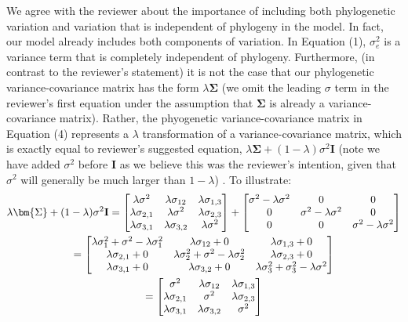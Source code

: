 \documentclass[11pt]{article}
\begin{document}
We agree with the reviewer about the importance of including both phylogenetic variation and variation that is independent of phylogeny in the model. In fact, our model already includes both components of variation. In Equation (1), $\sigma_e^2$ is a variance term that is completely independent of phylogeny. Furthermore, (in contrast to the reviewer's statement) it is not  the case that our phylogenetic variance-covariance matrix has the form $\lambda \bm{\Sigma}$ (we omit the leading $\sigma$ term in the reviewer's first equation under the assumption that $\bm{\Sigma}$ is already a variance-covariance matrix). Rather, the phyogenetic variance-covariance matrix in Equation (4) represents a $\lambda$ transformation of a variance-covariance matrix, which is exactly equal to reviewer's suggested equation, $\lambda \bm{\Sigma} + (1 - \lambda)\sigma^2\bm{I}$ (note we have added $\sigma^2$ before $\bm{I}$ as we believe this was the reviewer's intention, given that $\sigma^2$ will generally be much larger than $1-\lambda$) . To illustrate:\\

\begin{multline} \lambda \bm{\Sigma} + (1 - \lambda) \sigma^2{\bf I} =
  \begin{bmatrix}
    \lambda\sigma^2 & \lambda\sigma_{12} & \lambda\sigma_{1,3} \\
    \lambda\sigma_{2,1} & \lambda\sigma^2 & \lambda\sigma_{2,3} \\
    \lambda\sigma_{3,1} & \lambda\sigma_{3,2} & \lambda\sigma^2 \\
  \end{bmatrix}
  +
  \begin{bmatrix}
    \sigma^2 - \lambda\sigma^2 & 0 & 0 \\
    0 & \sigma^2 - \lambda\sigma^2 & 0 \\
    0 & 0 & \sigma^2-\lambda\sigma^2 \\
  \end{bmatrix}
  \\=
  \begin{bmatrix}
    \lambda\sigma_1^2 + \sigma^2 - \lambda\sigma_1^2 & \lambda\sigma_{12} +0 & \lambda\sigma_{1,3} +0\\
    \lambda\sigma_{2,1} +0 & \lambda\sigma_2^2 + \sigma^2 - \lambda\sigma_2^2 & \lambda\sigma_{2,3} +0\\
    \lambda\sigma_{3,1} +0 & \lambda\sigma_{3,2} +0 & \lambda\sigma_3^2 + \sigma_3^2 - \lambda\sigma^2 \\
  \end{bmatrix}
  \\=
  \begin{bmatrix}
    \sigma^2 & \lambda\sigma_{12} & \lambda\sigma_{1,3}\\
    \lambda\sigma_{2,1} & \sigma^2 & \lambda\sigma_{2,3}\\
    \lambda\sigma_{3,1}& \lambda\sigma_{3,2} & \sigma^2\\
  \end{bmatrix}
  \\
\end{multline}
\end{document}

